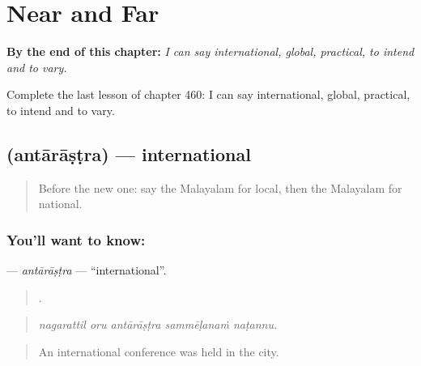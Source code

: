 
\chapter{Near and Far}
\label{ch:ml-near-and-far}

\begin{chapteropening}
\textbf{By the end of this chapter:} \emph{I can say international, global, practical, to intend and to vary.}

Complete the last lesson of chapter 460: I can say international, global, practical, to intend and to vary.
\end{chapteropening}

\section[\texorpdfstring{\ml{അന്താരാഷ്ട്ര} (antārāṣṭra)}{അന്താരാഷ്ട്ര (antārāṣṭra)}]{ (antārāṣṭra) — international}

\label{lesson:ML-C460-antarastra}



\begin{quote}
Before the new one: say the Malayalam for local, then the Malayalam for national.
\end{quote}

\subsection*{You'll want to know: }
\textbf{} — \emph{antārāṣṭra} — \textquotedblleft{}international\textquotedblright{}.

\begin{quote}
    .
\end{quote}

\begin{quote}
\emph{nagarattil oru antārāṣṭra sammēḷanaṁ naṭannu.}
\end{quote}

\begin{quote}
An international conference was held in the city.
\end{quote}

